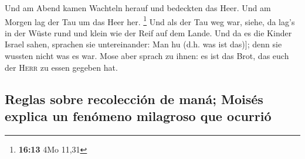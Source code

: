  Und am Abend kamen Wachteln herauf und bedeckten das
Heer. Und am Morgen lag der Tau um das Heer her. \footnote{\textbf{16:13}
  4Mo 11,31}  Und als der Tau weg war, siehe, da lag's in
der Wüste rund und klein wie der Reif auf dem Lande.  Und
da es die Kinder Israel sahen, sprachen sie untereinander: Man hu (d.h.
was ist das){]}; denn sie wussten nicht was es war. Mose aber sprach zu
ihnen: es ist das Brot, das euch der \textsc{Herr} zu essen gegeben hat.

\hypertarget{reglas-sobre-recolecciuxf3n-de-manuxe1-moisuxe9s-explica-un-fenuxf3meno-milagroso-que-ocurriuxf3}{%
\subsection{Reglas sobre recolección de maná; Moisés explica un fenómeno
milagroso que
ocurrió}\label{reglas-sobre-recolecciuxf3n-de-manuxe1-moisuxe9s-explica-un-fenuxf3meno-milagroso-que-ocurriuxf3}}

